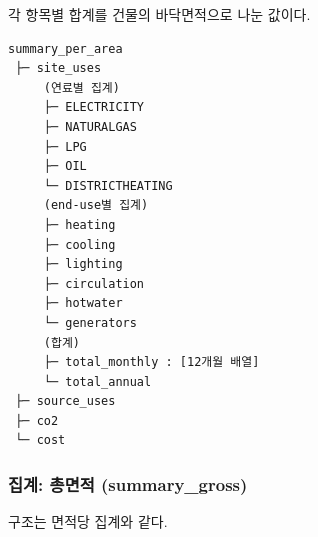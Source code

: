 각 항목별 합계를 건물의 바닥면적으로 나눈 값이다.

\begin{verbatim}
summary_per_area
 ├─ site_uses
     (연료별 집계)
     ├─ ELECTRICITY     
     ├─ NATURALGAS      
     ├─ LPG
     ├─ OIL             
     └─ DISTRICTHEATING 
     (end-use별 집계)
     ├─ heating     
     ├─ cooling      
     ├─ lighting
     ├─ circulation
     ├─ hotwater
     └─ generators      
     (합계)
     ├─ total_monthly : [12개월 배열]
     └─ total_annual
 ├─ source_uses
 ├─ co2
 └─ cost
\end{verbatim}

\subsubsection{집계: 총면적 (summary\_gross)}

구조는 면적당 집계와 같다.
